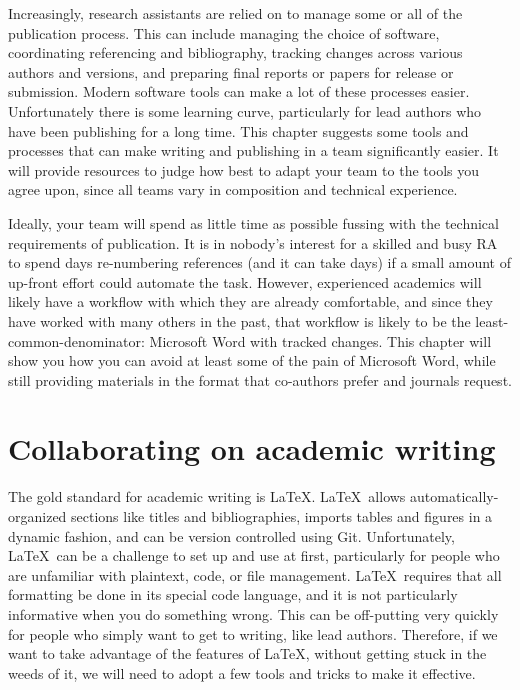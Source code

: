 
\begin{fullwidth}
Increasingly, research assistants are relied on to manage some or all
of the publication process. This can include
managing the choice of software,
coordinating referencing and bibliography,
tracking changes across various authors and versions,
and preparing final reports or papers for release or submission.
Modern software tools can make a lot of these processes easier.
Unfortunately there is some learning curve,
particularly for lead authors who have been publishing for a long time.
This chapter suggests some tools and processes
that can make writing and publishing in a team significantly easier.
It will provide resources
to judge how best to adapt your team to the tools you agree upon,
since all teams vary in composition and technical experience.

Ideally, your team will spend as little time as possible
fussing with the technical requirements of publication.
It is in nobody's interest for a skilled and busy RA
to spend days re-numbering references (and it can take days)
if a small amount of up-front effort could automate the task.
However, experienced academics will likely have a workflow
with which they are already comfortable,
and since they have worked with many others in the past,
that workflow is likely to be the least-common-denominator:
Microsoft Word with tracked changes.
This chapter will show you how you can avoid at least some
of the pain of Microsoft Word,
while still providing materials in the format
that co-authors prefer and journals request.
\end{fullwidth}


\section{Collaborating on academic writing}

The gold standard for academic writing is \LaTeX.
\index{\LaTeX}
\LaTeX\ allows automatically-organized sections like titles and bibliographies,
imports tables and figures in a dynamic fashion,
and can be version controlled using Git.
Unfortunately, \LaTeX\ can be a challenge to set up and use at first,
particularly for people who are unfamiliar with plaintext, code, or file management.
\LaTeX\ requires that all formatting be done in its special code language,
and it is not particularly informative when you do something wrong.
This can be off-putting very quickly for people
who simply want to get to writing, like lead authors.
Therefore, if we want to take advantage of the features of \LaTeX,
without getting stuck in the weeds of it,
we will need to adopt a few tools and tricks to make it effective.

